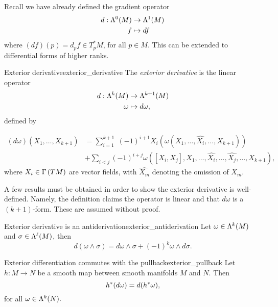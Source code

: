 Recall we have already defined the gradient operator
\begin{align*}
    d : \forms[0]{M} &\to \forms[1]{M}\\
                   f &\mapsto df
\end{align*}
where \((df)(p) = d_p f \in T_p ^{\ast}M\), for all \(p\in M\). This can be extended to differential forms of higher ranks.

\begin{definition}{Exterior derivative}{exterior_derivative}
    The \emph{exterior derivative} is the linear operator
    \begin{align*}
        d : \forms[k]{M} &\to \forms[k+1]{M}\\
                  \omega &\mapsto d\omega,
    \end{align*}
    defined by

    \begin{align*}
        (d\omega)\left(X_1, \dots, X_{k+1}\right) &= \sum_{i=1}^{k+1}\; (-1)^{i+1} X_i\left(\omega(X_1, \dots, \widehat{X_i}, \dots, X_{k+1})\right) \\
                                                  &+ \sum_{i < j} (-1)^{i+j} \omega\left([X_i, X_j], X_1, \dots, \widehat{X_i}, \dots, \widehat{X_j}, \dots, X_{k+1}\right),
    \end{align*}
    where \(X_i \in \sections{TM}\) are vector fields, with \(\widehat{X_m}\) denoting the omission of \(X_m\).
\end{definition}

A few results must be obtained in order to show the exterior derivative is well-defined. Namely, the definition claims the operator is linear and that \(d\omega\) is a \((k+1)\)-form. {\color{Red} These are assumed without proof.}

\begin{theorem}{Exterior derivative is an antiderivation}{exterior_antiderivation}
    Let \(\omega \in \forms[k]{M}\) and \(\sigma \in \forms[\ell]{M}\), then
    \begin{equation*}
        d(\omega \wedge \sigma) = d\omega \wedge \sigma + (-1)^{k} \omega \wedge d\sigma.
    \end{equation*}
\end{theorem}

\begin{theorem}{Exterior differentiation commutes with the pullback}{exterior_pullback}
    Let \(h : M \to N\) be a smooth map between smooth manifolds \(M\) and \(N\). Then
    \begin{equation*}
        \pb{h}(d\omega) = d(\pb{h}\omega),
    \end{equation*}
    for all \(\omega \in \forms[k]{N}.\)
\end{theorem}

